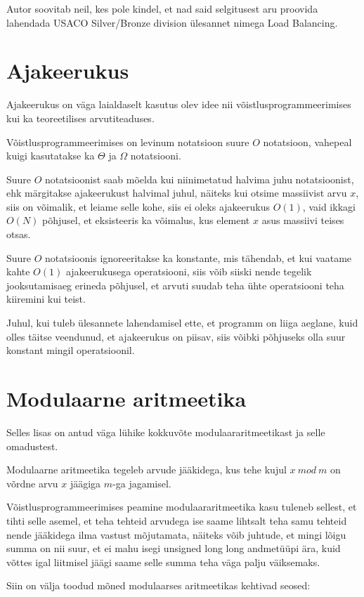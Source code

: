 \documentclass{trkut}
\theoremstyle{definition}
\begin{document}
\begin{appendices}
    Autor soovitab neil, kes pole kindel, et nad said selgitusest aru proovida lahendada USACO Silver/Bronze division ülesannet nimega Load Balancing\parencite{load}.

\chapter{Ajakeerukus}\label{lisa9}
    \tiny
    \normalsize
Ajakeerukus on väga laialdaselt kasutus olev idee nii võistlusprogrammeerimises kui ka teoreetilises arvutiteaduses.

Võistlusprogrammeerimises on levinum notatsioon suure $O$ notatsioon, vahepeal kuigi kasutatakse ka $\Theta$ ja $\Omega$ notatsiooni.

Suure $O$ notatsioonist saab mõelda kui niinimetatud halvima juhu notatsioonist, ehk märgitakse ajakeerukust halvimal juhul, näiteks kui otsime massiivist arvu $x$, siis on võimalik, et leiame selle kohe, siis ei oleks ajakeerukus $O(1)$, vaid ikkagi $O(N)$ põhjusel, et eksisteeris ka võimalus, kus element $x$ asus massiivi teises otsas.

Suure $O$ notatsioonis ignoreeritakse ka konstante, mis tähendab, et kui vaatame kahte $O(1)$ ajakeerukusega operatsiooni, siis võib siiski nende tegelik jooksutamisaeg erineda põhjusel, et arvuti suudab teha ühte operatsiooni teha kiiremini kui teist.

Juhul, kui tuleb ülesannete lahendamisel ette, et programm on liiga aeglane, kuid olles täitse veendunud, et ajakeerukus on piisav, siis võibki põhjuseks olla suur konstant mingil operatsioonil.
\chapter{Modulaarne aritmeetika}\label{lisa10}
    \tiny
    \normalsize
Selles lisas on antud väga lühike kokkuvõte modulaararitmeetikast ja selle omadustest.

Modulaarne aritmeetika tegeleb arvude jääkidega, kus tehe kujul $x\ mod\ m$  on võrdne arvu $x$ jäägiga $m$-ga jagamisel.

Võistlusprogrammeerimises peamine modulaararitmeetika kasu tuleneb sellest, et tihti selle asemel, et teha tehteid arvudega ise saame lihtsalt teha samu tehteid nende jääkidega ilma vastust mõjutamata, näiteks võib juhtude, et mingi lõigu summa on nii suur, et ei mahu isegi unsigned long long andmetüüpi ära, kuid võttes igal liitmisel jäägi saame selle summa teha väga palju väiksemaks.

Siin on välja toodud mõned modulaarses aritmeetikas kehtivad seosed:


\end{appendices}
\end{document}
